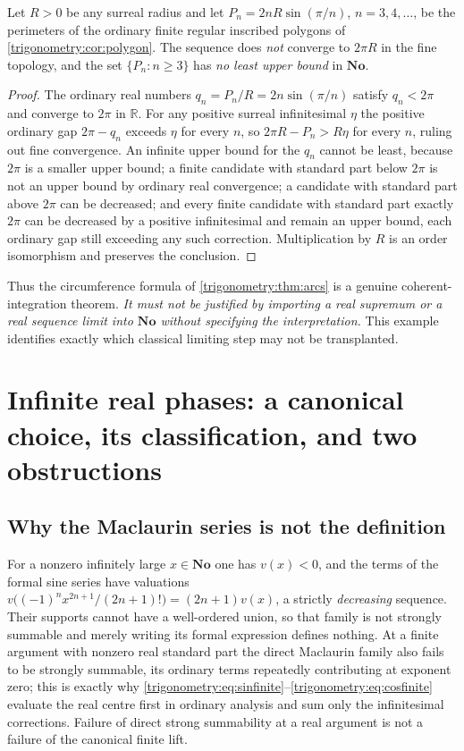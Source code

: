 \documentclass[11pt,letterpaper]{article}
\numberwithin{equation}{section}
\theoremstyle{definition}
\theoremstyle{remark}
\newcommand{\No}{\mathbf{No}}
\newcommand{\R}{\mathbb R}
\begin{document}
\begin{proposition}
\label{trigonometry:prop:perimeters}
Let $R>0$ be any surreal radius and let $P_n=2nR\sin(\pi/n)$, $n=3,4,\dots$, be the perimeters of
the ordinary finite regular inscribed polygons of \cref{trigonometry:cor:polygon}. The sequence
does \emph{not} converge to $2\pi R$ in the fine topology, and the set $\{P_n:n\ge3\}$ has \emph{no
least upper bound} in $\No$.
\end{proposition}
\begin{proof}
The ordinary real numbers $q_n=P_n/R=2n\sin(\pi/n)$ satisfy $q_n<2\pi$ and converge to $2\pi$ in
$\R$. For any positive surreal infinitesimal $\eta$ the positive ordinary gap $2\pi-q_n$ exceeds
$\eta$ for every $n$, so $2\pi R-P_n>R\eta$ for every $n$, ruling out fine convergence. An infinite
upper bound for the $q_n$ cannot be least, because $2\pi$ is a smaller upper bound; a finite
candidate with standard part below $2\pi$ is not an upper bound by ordinary real convergence; a
candidate with standard part above $2\pi$ can be decreased; and every finite candidate with
standard part exactly $2\pi$ can be decreased by a positive infinitesimal and remain an upper
bound, each ordinary gap still exceeding any such correction. Multiplication by $R$ is an order
isomorphism and preserves the conclusion.
\end{proof}
Thus the circumference formula of \cref{trigonometry:thm:arcs} is a genuine coherent-integration
theorem. \emph{It must not be justified by importing a real supremum or a real sequence limit into
$\No$ without specifying the interpretation.} This example identifies exactly which classical
limiting step may not be transplanted.

\section{Infinite real phases: a canonical choice, its classification, and two obstructions}
\label{trigonometry:sec:global}

\subsection{Why the Maclaurin series is not the definition}
For a nonzero infinitely large $x\in\No$ one has $v(x)<0$, and the terms of the formal sine series
have valuations $v\bigl((-1)^nx^{2n+1}/(2n+1)!\bigr)=(2n+1)v(x)$, a strictly \emph{decreasing}
sequence. Their supports cannot have a well-ordered union, so that family is not strongly summable
and merely writing its formal expression defines nothing. At a finite argument with nonzero real
standard part the direct Maclaurin family also fails to be strongly summable, its ordinary terms
repeatedly contributing at exponent zero; this is exactly why
\cref{trigonometry:eq:sinfinite}--\cref{trigonometry:eq:cosfinite} evaluate the real centre first
in ordinary analysis and sum only the infinitesimal corrections. Failure of direct strong
summability at a real argument is not a failure of the canonical finite lift.
\end{document}
